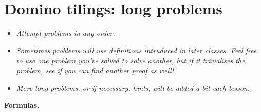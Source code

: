 \documentclass[11pt,fleqn]{book} %
\begin{document}
  \renewcommand*\rmdefault{ppl}\normalfont\upshape


\setcounter{problem}{0}







\newpage
\chapter*{Domino tilings: long problems}

\begin{itemize}
 \item \textit{Attempt problems in any order.}
 \item \textit{Sometimes problems will use definitions intruduced in later classes. Feel free to use one problem you've solved to solve another, but if it trivialises the problem, see if you can find another proof as well!}
 \item \textit{More long problems, or if necessary, hints, will be added a bit each lesson.}
\end{itemize}



\textbf{Formulas.}
\end{document}
